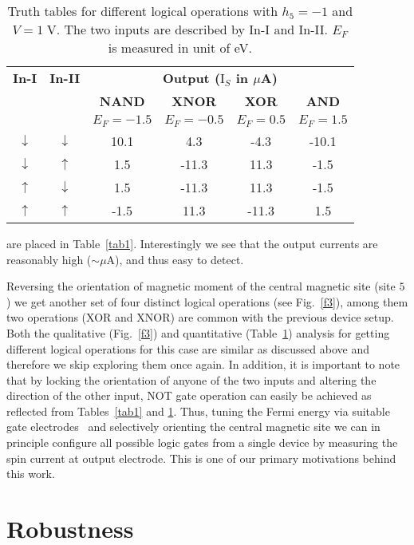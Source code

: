 \documentclass[doublecol]{epl2}
\begin{document}
\begin{table}[ht]
\caption{Truth tables for different logical operations with $h_5=-1$ and
$V=1\;$V. The two inputs are described by In-I and In-II. $E_F$ is measured 
in unit of eV.}
$~$ 
\vskip -0.25cm
\fontsize{7}{7}
\begin{tabular}{|c|c|c|c|c|c|}
 \hline
\textbf{In-I} & \textbf{In-II} &
\multicolumn{4}{c|}{\textbf{Output ($\mbox{I}_S$ in $\mu$A)}} \\
\cline{3-6}
 &  & \textbf{NAND} &\textbf{XNOR} & \textbf{XOR} & \textbf{AND} \\
 &  & $E_F=-1.5$ & $E_F=-0.5$ & $E_F=0.5$ & $E_F=1.5$ \\
 \hline
 $\downarrow$  & $\downarrow$ & 10.1 & 4.3 & -4.3 & -10.1 \\
    $\downarrow$  & $\uparrow$  & 1.5 & -11.3 & 11.3 & -1.5 \\
    $\uparrow$  & $\downarrow$  & 1.5 & -11.3 & 11.3 & -1.5 \\
    $\uparrow$  & $\uparrow$  & -1.5 & 11.3 & -11.3 & 1.5 \\
 \hline
\end{tabular}
\label{tab2}
\end{table}
are placed in Table~\ref{tab1}. Interestingly we see that the output 
currents are reasonably high ($\sim \mu$A), and thus easy to detect.

Reversing the orientation of magnetic moment of the central magnetic site
(site $5$) we get another set of four distinct logical operations (see 
Fig.~\ref{f3}), among them two operations (XOR and XNOR) are common with 
the previous device setup. Both the qualitative (Fig.~\ref{f3}) and 
quantitative (Table~\ref{tab2}) analysis for getting different logical 
operations for this case are similar as discussed above and therefore 
we skip exploring them once again. In addition, it is important to note 
that by locking the orientation of anyone of the two inputs and altering 
the direction of the other input, NOT gate operation can easily be achieved 
as reflected from Tables~\ref{tab1} and \ref{tab2}. Thus, tuning the Fermi 
energy via suitable gate electrodes~\cite{gate1,gate2} and selectively 
orienting the central magnetic site we can in principle configure all 
possible logic gates from a single device by measuring the spin current 
at output electrode. This is one of our primary motivations behind this work.

\section{Robustness}
\end{document}
